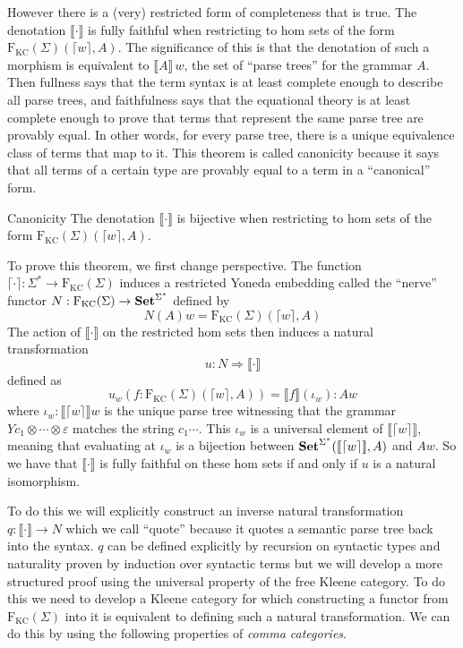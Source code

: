 \documentclass[acmsmall,anonymous,review,screen]{acmart}
\newcommand{\cat}[1]{
  \relax
  \StrLen{#1}[\arglength]
  \ifnum\arglength=1
  \mathcal{#1}
  \else
  \mathbf{#1}
  \fi
}
\newcommand{\FKC}{\textrm{F}_{\textrm{KC}}}
\newcommand{\sem}[1]{\llbracket{#1}\rrbracket}
\newcommand{\Set}{\cat{Set}}
\begin{document}
However there is a (very) restricted form of completeness that is
true. The denotation $\sem{\cdot}$ is fully faithful when restricting
to hom sets of the form $\FKC(\Sigma)(\lceil w \rceil, A)$. The
significance of this is that the denotation of such a morphism is
equivalent to $\sem{A}\,w$, the set of ``parse trees'' for the grammar
$A$. Then fullness says that the term syntax is at least complete
enough to describe all parse trees, and faithfulness says that the
equational theory is at least complete enough to prove that terms that
represent the same parse tree are provably equal. In other words, for
every parse tree, there is a unique equivalence class of terms that
map to it. This theorem is called canonicity because it says that all
terms of a certain type are provably equal to a term in a
``canonical'' form.

\begin{theorem}{Canonicity}
  The denotation $\sem{\cdot}$ is bijective when restricting to hom
  sets of the form $\FKC(\Sigma)(\lceil w \rceil, A)$.
\end{theorem}

To prove this theorem, we first change perspective. The function
$\lceil \cdot \rceil : \Sigma^* \to \FKC(\Sigma)$ induces a restricted
Yoneda embedding called the ``nerve'' functor $N : \FKC(\Sigma) \to
\Set^{\Sigma^*}$ defined by
\[ N(A)w = \FKC(\Sigma)(\lceil w \rceil, A) \]
The action of $\sem{\cdot}$ on the restricted hom sets then induces a
natural transformation
\[ u : N \Rightarrow \sem{\cdot} \]
defined as
\[ u_w(f : \FKC(\Sigma)(\lceil w \rceil , A)) = \sem{f}(\iota_w) : A w \]
where $\iota_w : \sem{\lceil w \rceil} w$ is the unique parse tree
witnessing that the grammar $Y c_1 \otimes \cdots \otimes \varepsilon$
matches the string $c_1\cdots$. This $\iota_w$ is a universal element
of $\sem{\lceil w \rceil}$, meaning that evaluating at $\iota_w$ is a
bijection between $\Set^{\Sigma^*}(\sem{\lceil w \rceil}, A)$ and $A w$. So we
have that $\sem{\cdot}$ is fully faithful on these hom sets if and
only if $u$ is a natural isomorphism.

To do this we will explicitly construct an inverse natural
transformation $q : \sem{\cdot} \to N$ which we call ``quote'' because it quotes
a semantic parse tree back into the syntax. $q$ can be defined
explicitly by recursion on syntactic types and naturality proven by
induction over syntactic terms but we will develop a more structured
proof using the universal property of the free Kleene category.  To do
this we need to develop a Kleene category for which constructing a
functor from $\FKC(\Sigma)$ into it is equivalent to defining such a
natural transformation. We can do this by using the following
properties of \emph{comma categories}.
\end{document}
